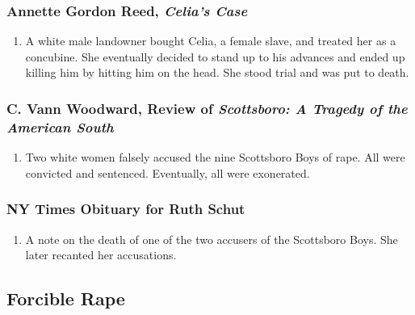 \subsubsection{Annette Gordon Reed, \emph{Celia's Case}}

\begin{enumerate}
    \item A white male landowner bought Celia, a female slave, and treated her 
    as a concubine. She eventually decided to stand up to his advances and 
    ended up killing him by hitting him on the head. She stood trial and was 
    put to death.
\end{enumerate}

\subsubsection{C. Vann Woodward, Review of \emph{Scottsboro: A Tragedy of the 
American South}}

\begin{enumerate}
    \item Two white women falsely accused the nine Scottsboro Boys of rape. 
    All were convicted and sentenced. Eventually, all were exonerated.
\end{enumerate}

\subsubsection{NY Times Obituary for Ruth Schut}

\begin{enumerate}
    \item A note on the death of one of the two accusers of the Scottsboro 
    Boys. She later recanted her accusations.
\end{enumerate}

\subsection{Forcible Rape}

